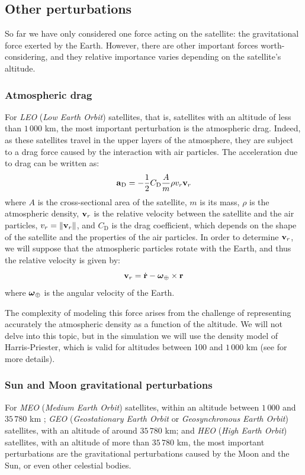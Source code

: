 \documentclass[../main.tex]{subfiles}
\begin{document}
\subsection{Other perturbations}
So far we have only considered one force acting on the satellite: the gravitational force exerted by the Earth. However, there are other important forces worth-considering, and they relative importance varies depending on the satellite's altitude.

\subsubsection{Atmospheric drag}
For \emph{LEO} (\emph{Low Earth Orbit}) satellites, that is, satellites with an altitude of less than $1\,000$ km, the most important perturbation is the atmospheric drag. Indeed, as these satellites travel in the upper layers of the atmosphere, they are subject to a drag force caused by the interaction with air particles. The acceleration due to drag can be written as:
\begin{equation}
  \boldsymbol{\mathrm{a}}_{\mathrm{D}}=-\frac{1}{2}C_{\mathrm{D}}\frac{A}{m}\rho v_r\boldsymbol{\mathrm{v}}_r
\end{equation}
where $A$ is the cross-sectional area of the satellite, $m$ is its mass, $\rho$ is the atmospheric density, $\boldsymbol{\mathrm{v}}_r$ is the relative velocity between the satellite and the air particles, $v_r=\left\|\boldsymbol{\mathrm{v}}_r\right\|$, and $C_{\mathrm{D}}$ is the drag coefficient, which depends on the shape of the satellite and the properties of the air particles. In order to determine $\boldsymbol{\mathrm{v}}_r$, we will suppose that the atmospheric particles rotate with the Earth, and thus the relative velocity is given by:
\begin{equation}
  \boldsymbol{\mathrm{v}}_r=\dot{\boldsymbol{\mathrm{r}}}-\boldsymbol{\mathrm{\omega}}_\oplus\times\boldsymbol{\mathrm{r}}
\end{equation}
where $\boldsymbol{\mathrm{\omega}}_\oplus$ is the angular velocity of the Earth.

The complexity of modeling this force arises from the challenge of representing accurately the atmospheric density as a function of the altitude. We will not delve into this topic, but in the simulation we will use the density model of Harris-Priester, which is valid for altitudes between 100 and $1\,000$ km (see \cite{montenbruck} for more details).

\subsubsection{Sun and Moon gravitational perturbations}
For \emph{MEO} (\emph{Medium Earth Orbit}) satellites, within an altitude between $1\,000$ and $35\,780$ km \cite{vallado}; \emph{GEO} (\emph{Geostationary Earth Orbit} or \emph{Geosynchronous Earth Orbit}) satellites, with an altitude of around $35\,780$ km; and \emph{HEO} (\emph{High Earth Orbit}) satellites, with an altitude of more than $35\,780$ km, the most important perturbations are the gravitational perturbations caused by the Moon and the Sun, or even other celestial bodies.
\end{document}
